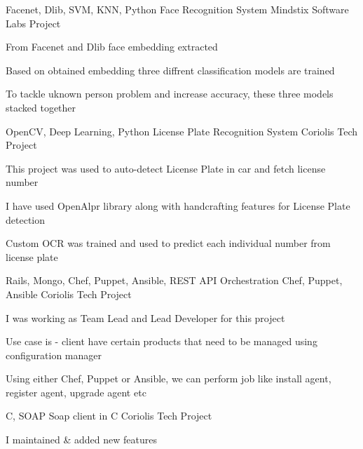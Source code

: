 \begin{cventries}
   \cventry
    {Facenet, Dlib, SVM, KNN, Python} %
    {Face Recognition System} %
    {Mindstix Software Labs Project} %
    {} %
    {
      \begin{cvitems} %
        \item {From Facenet and Dlib face embedding extracted}
        \item {Based on obtained embedding three diffrent classification models are trained }
        \item {To tackle uknown person problem and increase accuracy, these three models stacked together}
      \end{cvitems}
    }
   
   \cventry
    {OpenCV, Deep Learning, Python} %
    {License Plate Recognition System} %
    {Coriolis Tech Project} %
    {} %
    {
      \begin{cvitems} %
        \item {This project was used to auto-detect License Plate in car and fetch license number}
        \item {I have used OpenAlpr library along with handcrafting features for License Plate detection}
        \item {Custom OCR was trained and used to predict each individual number from license plate}
      \end{cvitems}
    }
   
   \cventry
    {Rails, Mongo, Chef, Puppet, Ansible, REST API} %
    {Orchestration Chef, Puppet, Ansible} %
    {Coriolis Tech Project} %
    {} %
    {
      \begin{cvitems} %
        \item {I was working as Team Lead and Lead Developer for this project}
        \item {Use case is - client have certain products that need to be managed using configuration manager}
        \item {Using either Chef, Puppet or Ansible, we can perform job like install agent, register agent, upgrade agent etc}
      \end{cvitems}
    }
   
    \cventry
    {C, SOAP} %
    {Soap client in C} %
    {Coriolis Tech Project} %
    {} %
    {
      \begin{cvitems} %
        \item {I maintained \& added new features}
      \end{cvitems}
    }
   

\end{cventries}
